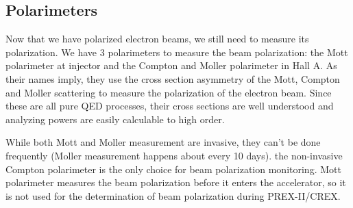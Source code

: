\subsection{Polarimeters}
Now that we have polarized electron beams, we still need to measure its polarization.
We have 3 polarimeters to measure the beam polarization: the Mott polarimeter
at injector and the Compton and Moller polarimeter in Hall A. As their names
imply, they use the cross section asymmetry of the Mott, Compton and Moller
scattering to measure the polarization of the electron beam. Since these are
all pure QED processes, their cross sections are well understood and analyzing 
powers are easily calculable to high order.

While both Mott and Moller measurement are invasive, they can't be done frequently
(Moller measurement happens about every 10 days).
the non-invasive Compton polarimeter is the only choice for beam polarization monitoring. 
Mott polarimeter measures the beam polarization before it enters the accelerator, 
so it is not used for the determination of beam polarization during PREX-II/CREX.

